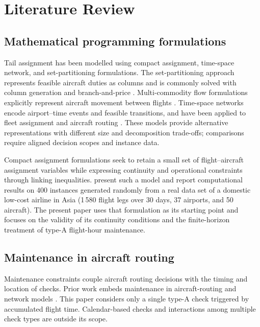 \section{Literature Review}
\label{sec:literature}

\subsection{Mathematical programming formulations}

Tail assignment has been modelled using compact assignment, time-space
network, and set-partitioning formulations. The set-partitioning approach
represents feasible aircraft duties as columns and is commonly solved with
column generation and branch-and-price
\citep{lavoie1988new,minoux1984column,barnhart1998flight,sarac2006branch}.
Multi-commodity flow formulations explicitly represent aircraft movement
between flights \citep{levin1971scheduling}. Time-space networks encode
airport--time events and feasible transitions, and have been applied to fleet
assignment and aircraft routing
\citep{hane1995fleet,clarke1996maintenance,sherali2006airline}. These models
provide alternative representations with different size and decomposition
trade-offs; comparisons require aligned decision scopes and instance data.

Compact assignment formulations seek to retain a small set of flight--aircraft
assignment variables while expressing continuity and operational constraints
through linking inequalities. \citet{khaled2018compact} present such a model
and report computational results on 400 instances generated randomly from a
real data set of a domestic low-cost airline in Asia (1\,580 flight legs
over 30 days, 37 airports, and 50 aircraft). The present paper
uses that formulation as its starting point and focuses on the validity of
its continuity conditions and the finite-horizon treatment of type-A
flight-hour maintenance.

\subsection{Maintenance in aircraft routing}

Maintenance constraints couple aircraft routing decisions with the timing
and location of checks. Prior work embeds maintenance in aircraft-routing
and network models \citep{clarke1997aircraft,barnhart1998flight,
cordeau2001benders,lacasse2010aircraft,liang2011new,liang2012network}.
This paper considers only a single type-A check triggered by accumulated
flight time. Calendar-based checks and interactions among multiple check
types are outside its scope.

